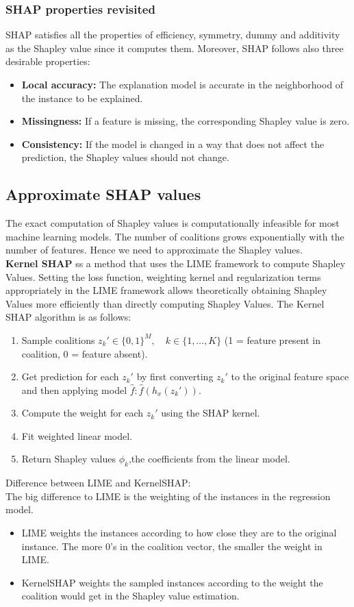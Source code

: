 \subsubsection{SHAP properties revisited}
SHAP satisfies all the properties of efficiency, symmetry, dummy and additivity as the Shapley value since it computes them.
Moreover, SHAP follows also three desirable properties:
\begin{itemize}
    \item \textbf{Local accuracy:} The explanation model is accurate in the neighborhood of the instance to be explained.
    \item \textbf{Missingness:} If a feature is missing, the corresponding Shapley value is zero.
    \item \textbf{Consistency:} If the model is changed in a way that does not affect the prediction, the Shapley values should not change.
\end{itemize}

\subsection{Approximate SHAP values}
The exact computation of Shapley values is computationally infeasible for most machine learning models. The number of coalitions grows exponentially with the number of features. Hence we need to approximate the Shapley values.\\

\textbf{Kernel SHAP}
ss a method that uses the LIME framework to compute Shapley Values. Setting the loss function, weighting kernel and regularization terms appropriately in the LIME framework allows theoretically obtaining Shapley Values more efficiently than directly computing Shapley Values.
The Kernel SHAP algorithm is as follows:
\begin{enumerate}
    \item Sample coalitions $z_k'\in\{0,1\}^M,\quad{}k\in\{1,\ldots,K\}$ (1 = feature present in coalition, 0 = feature absent).
    \item Get prediction for each $z_k'$ by first converting $z_k'$  to the original feature space and then applying model $\hat{f}: \hat{f}(h_x(z_k'))$.
    \item Compute the weight for each $z_k'$ using the SHAP kernel.
    \item Fit weighted linear model.
    \item Return Shapley values $\phi_k$,the coefficients from the linear model.
\end{enumerate}
Difference between LIME and KernelSHAP:\\
The big difference to LIME is the weighting of the instances in the regression model.
\begin{itemize}
    \item LIME weights the instances according to how close they are to the original instance. The more 0's in the coalition vector, the smaller the weight in LIME.
    \item KernelSHAP weights the sampled instances according to the weight the coalition would get in the Shapley value estimation.\\
\end{itemize}

